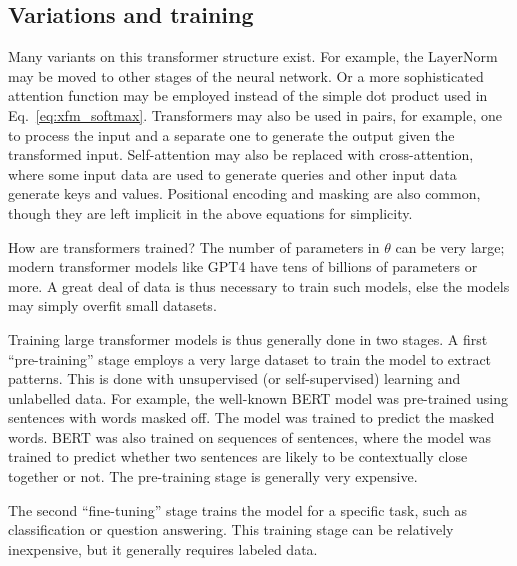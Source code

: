 \subsection{Variations and training}

Many variants on this transformer structure exist.  For example, the $\text{LayerNorm}$ may be moved to other stages of the neural network.  Or a more sophisticated attention function may be employed instead of the simple dot product used in Eq.~\ref{eq:xfm_softmax}.  Transformers may also be used in pairs, for example, one to process the input and a separate one to generate the output given the transformed input.  Self-attention may also be replaced with cross-attention, where some input data are used to generate queries and other input data generate keys and values.  Positional encoding and masking are also common, though they are left implicit in the above equations for simplicity.

How are transformers trained?  The number of parameters in $\theta$ can be very large; modern transformer models like GPT4 have tens of billions of parameters or more.  A great deal of data is thus necessary to train such models, else the models may simply overfit small datasets.

Training large transformer models is thus generally done in two stages.  A first ``pre-training'' stage employs a very large dataset to train the model to extract patterns.  This is done with unsupervised (or self-supervised) learning and unlabelled data.  For example, the well-known BERT model was pre-trained using sentences with words masked off.  The model was trained to predict the masked words.  BERT was also trained on sequences of sentences, where the model was trained to predict whether two sentences are likely to be contextually close together or not.  The pre-training stage is generally very expensive.

The second ``fine-tuning'' stage trains the model for a specific task, such as classification or question answering.  This training stage can be relatively inexpensive, but it generally requires labeled data.



